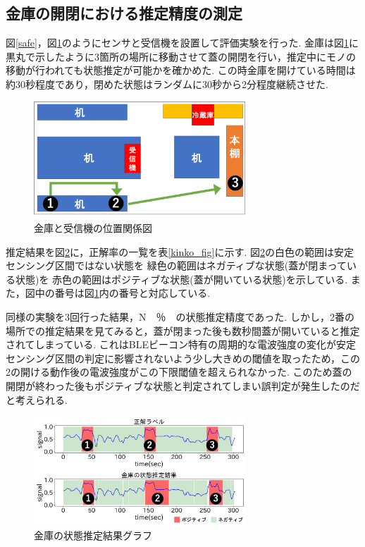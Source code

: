 \documentclass[Japanese]{dicomopapers}
\begin{document}
\subsection{金庫の開閉における推定精度の測定}
図\ref{safe}，図\ref{kinko_position}のようにセンサと受信機を設置して評価実験を行った.
金庫は図\ref{kinko_position}に黒丸で示したように3箇所の場所に移動させて蓋の開閉を行い，推定中にモノの移動が行われても状態推定が可能かを確かめた.
この時金庫を開けている時間は約30秒程度であり，閉めた状態はランダムに30秒から2分程度継続させた.

\begin{figure}[h]
    \centering
    \includegraphics[width=8cm]{kinko_position_fig.png}
    \caption{金庫と受信機の位置関係図}
    \label{kinko_position}
\end{figure}

推定結果を図\ref{kinko_graph}に，正解率の一覧を表\ref{kinko_fig}に示す.
図\ref{kinko_graph}の白色の範囲は安定センシング区間ではない状態を 緑色の範囲はネガティブな状態(蓋が閉まっている状態)を 赤色の範囲はポジティブな状態(蓋が開いている状態)を示している.
また，図中の番号は図\ref{kinko_position}内の番号と対応している.

同様の実験を3回行った結果，N　％　の状態推定精度であった.
しかし，2番の場所での推定結果を見てみると，蓋が閉まった後も数秒間蓋が開いていると推定されてしまっている.
これはBLEビーコン特有の周期的な電波強度の変化が安定センシング区間の判定に影響されないよう少し大きめの閾値を取ったため，この2の開ける動作後の電波強度がこの下限閾値を超えられなかった.
このため蓋の開閉が終わった後もポジティブな状態と判定されてしまい誤判定が発生したのだと考えられる.


\begin{figure}[ht]
    \centering
    \includegraphics[width=8cm]{kinko_graph.png}
    \caption{金庫の状態推定結果グラフ}
    \label{kinko_graph}
\end{figure}
\end{document}
